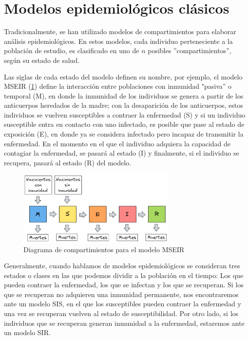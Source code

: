 \section{Modelos epidemiológicos clásicos}\label{sec:ModelosEpidemiológicosClásicos}

Tradicionalmente, se han utilizado modelos de compartimientos para elaborar análisis epidemiológicos. En estos modelos, cada individuo perteneciente a la población de estudio, es clasificado en uno de $n$ posibles ''compartimientos'', según su estado de salud.

Las siglas de cada estado del modelo definen su nombre, por ejemplo, el modelo MSEIR (\ref{fig:MSEIR}) define la interacción entre poblaciones con inmunidad "pasiva'' o temporal (M), en donde la inmunidad de los individuos se genera a partir de los anticuerpos heredados de la madre; con la desaparición de los anticuerpos, estos individuos se vuelven susceptibles a contraer la enfermedad (S) y si un individuo susceptible entra en contacto con uno infectado, es posible que pase al estado de exposición (E), en donde ya se considera infectado pero incapaz de transmitir la enfermedad. En el momento en el que el individuo adquiera la capacidad de contagiar la enfermedad, se pasará al estado (I) y finalmente, si el individuo se recupera, pasará al estado (R) del modelo.\cite{modelCompartimental}

\begin{figure}[h]
  \centering
    \includegraphics[width=0.7\textwidth]{Imagenes/MSEIR_compatimientos.PNG}
  \caption{Diagrama de compartimientos para el modelo MSEIR}
  \label{fig:MSEIR}
\end{figure}

Generalmente, cuando hablamos de modelos epidemiológicos se consideran tres estados o clases en las que podemos dividir a la población en el tiempo: Los que pueden contraer la enfermedad, los que se infectan y los que se recuperan. Si los que se recuperan no adquieren una inmunidad permanente, nos encontraremos ante un modelo SIS, en el que los susceptibles pueden contraer la enfermedad y una vez se recuperan vuelven al estado de susceptibilidad. Por otro lado, si los individuos que se recuperan generan inmunidad a la enfermedad, estaremos ante un modelo SIR. 

